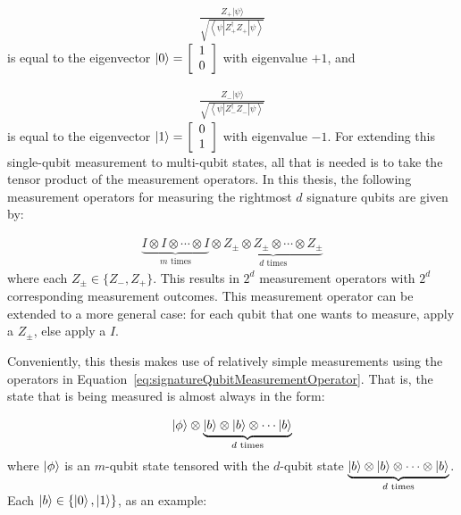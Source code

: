 \begin{align}
\frac{Z_+|\psi\rangle}{\sqrt{\left\langle\psi\left|Z_+^{\dagger} Z_+\right| \psi\right\rangle}}
\end{align}
is equal to the eigenvector $\ket{0} = \left[\begin{array}{ll}
1\\
0
\end{array}\right]$ with eigenvalue $+1$, and

\begin{align}
\frac{Z_-|\psi\rangle}{\sqrt{\left\langle\psi\left|Z_-^{\dagger} Z_-\right| \psi\right\rangle}}
\end{align}
is equal to the eigenvector $\ket{1} = \left[\begin{array}{ll}
0\\
1
\end{array}\right]$ with eigenvalue $-1$. For extending this single-qubit measurement to multi-qubit states, all that is needed is to take the tensor product of the measurement operators. In this thesis, the following measurement operators for measuring the rightmost $d$ signature qubits are given by:


\begin{align}
\underbrace{I \otimes I \otimes \cdots \otimes I}_{m \text{ times}} \otimes \underbrace{Z_{\pm} \otimes Z_{\pm} \otimes \cdots \otimes Z_{\pm}}_{d \text{ times}} \label{eq:signatureQubitMeasurementOperator}
\end{align}
where each $Z_{\pm} \in \{Z_-, Z_+\}$. This results in $2^d$ measurement operators with $2^d$ corresponding measurement outcomes. This measurement operator can be extended to a more general case: for each qubit that one wants to measure, apply a $Z_{\pm} $, else apply a $I$. 

Conveniently, this thesis makes use of relatively simple measurements using the operators in Equation~\eqref{eq:signatureQubitMeasurementOperator}. That is, the state that is being measured is almost always in the form:

\begin{align}
\ket{\phi} \otimes \underbrace{\ket{b} \otimes \ket{b} \otimes \cdots \ket{b}}_{d \text{ times}} 
\end{align}
where $\ket{\phi}$ is an $m$-qubit state tensored with the $d$-qubit state $\underbrace{\ket{b} \otimes \ket{b} \otimes \cdots \otimes \ket{b}}_{d \text{ times}}$. Each $\ket{b} \in \{\ket{0},\ket{1}\}$, as an example:

